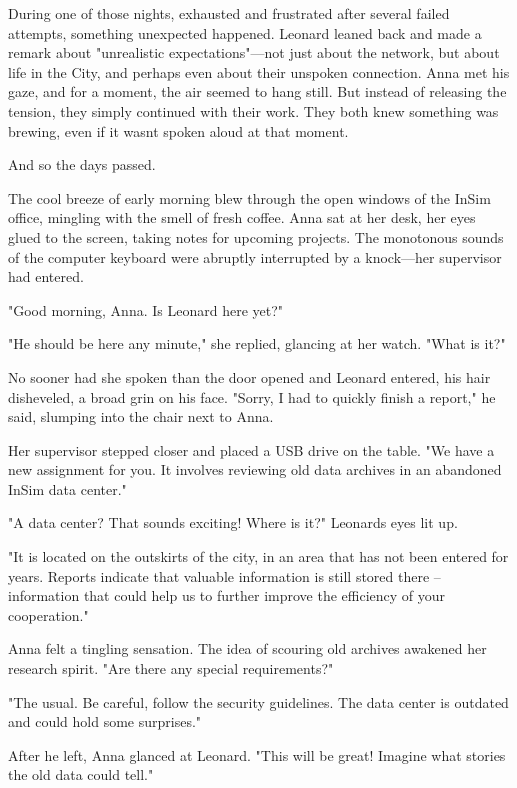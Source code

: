 \documentclass[
]{article}
\begin{document}
During one of those nights, exhausted and frustrated after several failed attempts, something unexpected happened. Leonard leaned back and made a remark about "unrealistic expectations"---not just about the network, but about life in the City, and perhaps even about their unspoken connection. Anna met his gaze, and for a moment, the air seemed to hang still. But instead of releasing the tension, they simply continued with their work. They both knew something was brewing, even if it wasn\textquotesingle t spoken aloud at that moment.

And so the days passed.

The cool breeze of early morning blew through the open windows of the InSim office, mingling with the smell of fresh coffee. Anna sat at her desk, her eyes glued to the screen, taking notes for upcoming projects. The monotonous sounds of the computer keyboard were abruptly interrupted by a knock---her supervisor had entered.

"Good morning, Anna. Is Leonard here yet?"

"He should be here any minute," she replied, glancing at her watch. "What is it?"

No sooner had she spoken than the door opened and Leonard entered, his hair disheveled, a broad grin on his face. "Sorry, I had to quickly finish a report," he said, slumping into the chair next to Anna.

Her supervisor stepped closer and placed a USB drive on the table. "We have a new assignment for you. It involves reviewing old data archives in an abandoned InSim data center."

"A data center? That sounds exciting! Where is it?" Leonard\textquotesingle s eyes lit up.

"It is located on the outskirts of the city, in an area that has not been entered for years. Reports indicate that valuable information is still stored there -- information that could help us to further improve the efficiency of your cooperation."

Anna felt a tingling sensation. The idea of \hspace{0pt}\hspace{0pt}scouring old archives awakened her research spirit. "Are there any special requirements?"

"The usual. Be careful, follow the security guidelines. The data center is outdated and could hold some surprises."

After he left, Anna glanced at Leonard. "This will be great! Imagine what stories the old data could tell."
\end{document}
